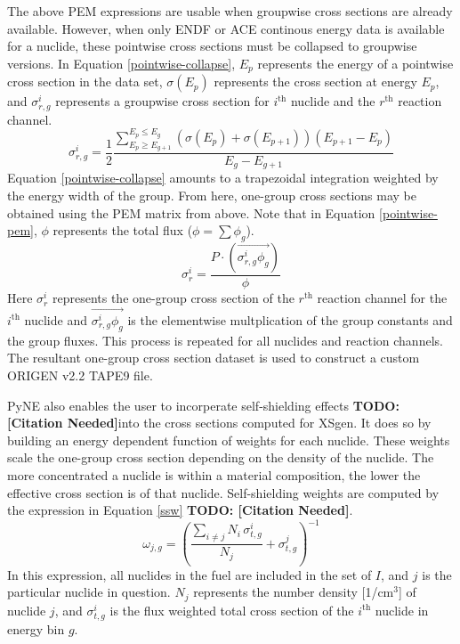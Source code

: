 \documentclass{article}
\newcommand{\TODO}[1] {{\color{red}\textbf{TODO: #1}}}
\newcommand{\citeme}{\TODO{[Citation Needed]}}
\begin{document}
The above PEM expressions are usable when groupwise cross sections are already available.
However, when only ENDF or ACE continous energy data is available for a nuclide, these pointwise
cross sections must be collapsed to groupwise versions.
In Equation \ref{pointwise-collapse}, $E_p$ represents the energy of a pointwise cross section
in the data set,
$\sigma(E_p)$ represents the cross section at energy $E_p$, and $\sigma_{r,g}^i$ represents a
groupwise cross section for $i^\mathrm{th}$ nuclide and the $r^\mathrm{th}$ reaction channel.
\begin{equation}
\label{pointwise-collapse}
\sigma_{r,g}^i = \frac{1}{2} \frac{\sum_{E_p\ge E_{g+1}}^{E_p\le E_g}
                                   \left(\sigma(E_p)+\sigma(E_{p+1})\right)
                                   \left(E_{p+1}-E_{p}\right)}
                                  {E_g-E_{g+1}}
\end{equation}
Equation \ref{pointwise-collapse} amounts to a trapezoidal integration weighted by the
energy width of the group. From here, one-group cross sections may be obtained using the PEM
matrix from above. Note that in Equation \ref{pointwise-pem}, $\phi$ represents the total
flux ($\phi=\sum\phi_g$).
\begin{equation}
\label{pointwise-pem}
\sigma_{r}^i=\frac{P \cdot (\overrightarrow{\sigma_{r,g}^i \phi_g})}{\phi}
\end{equation}
Here $\sigma_{r}^i$ represents the one-group cross section of the $r^\mathrm{th}$ reaction
channel for the $i^\mathrm{th}$ nuclide and $\overrightarrow{\sigma_{r,g}^i \phi_g}$ is the
elementwise multplication of the group constants and the group fluxes.
This process is repeated for all nuclides and reaction channels. The resultant one-group
cross section dataset is used to construct a custom ORIGEN v2.2 TAPE9 file\cite{origen2}.

PyNE also enables the user to incorperate self-shielding effects \citeme into the cross sections
computed for XSgen. It does so by building an energy dependent function of weights for each
nuclide. These weights scale the one-group cross section depending on the density of the
nuclide. The more concentrated a nuclide is within a material composition, the lower the
effective cross section is of that nuclide. Self-shielding weights are computed by the
expression in Equation \ref{ssw} \citeme.
\begin{equation}
\label{ssw}
\omega_{j,g}=\left(\frac{\sum_{i\neq j}N_i \, \sigma_{t,g}^i}{N_j}+\sigma_{t,g}^j\right)^{-1}
\end{equation}
In this expression, all nuclides in the fuel are included in the set of $I$, and $j$ is
the particular nuclide in question. $N_j$ represents the number density [1/cm$^3$] of
nuclide $j$, and $\sigma_{t,g}^i$ is the flux weighted total cross section of
the $i^\mathrm{th}$ nuclide in energy bin $g$.
\end{document}
